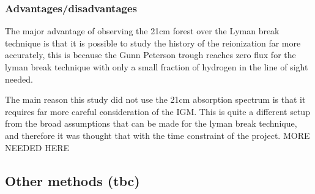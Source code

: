
         \subsubsection{Advantages/disadvantages} %
	\label{subsub:Advantages_disadvantages_21cm}
The major advantage of observing the 21cm forest over the Lyman break technique is that it is possible to study the history of the reionization far more accurately, this is because the Gunn Peterson trough reaches zero flux for the lyman break technique with only a small fraction of hydrogen in the line of sight needed. 

The main reason this study did not use the 21cm absorption spectrum is that it requires far more careful consideration of the IGM.  This is quite a different setup from the broad assumptions that can be made for the lyman break technique, and therefore it was thought that with the time constraint of the project. MORE NEEDED HERE

    \subsection{Other methods (tbc)} %
    \label{sub:Other_Methods_Reionization}
